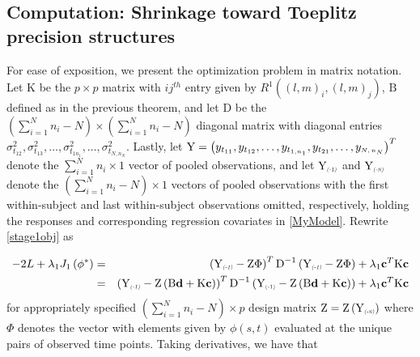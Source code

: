 \documentclass[12pt]{article}
\newcommand{\lmr}{\fontfamily{lmr}\selectfont} %
\newcommand{\bfd}{\mbox{\bf d}}
\newcommand{\bfc}{\mbox{\bf c}}
\newcommand{\bigY}{\mbox{Y}}
\newcommand{\matK}{\mbox{K}}
\newcommand{\matB}{\mbox{B}}
\newcommand{\matD}{\mbox{D}}
\newcommand{\matZ}{\mbox{Z}}
\begin{document}
\subsection{Computation: Shrinkage toward Toeplitz precision structures}
For ease of exposition, we present the optimization problem in matrix notation. Let $\matK$ be the $p \times p$ matrix with $ij^{th}$ entry given by $R^1\left( \left(l,m\right)_i, \left(l,m\right)_j \right)$, $\matB$ defined as in the previous theorem, and let $\matD$ be the $\left( \sum_{i=1}^N n_i - N\right) \times \left( \sum_{i=1}^N n_i - N\right)$ diagonal matrix with diagonal entries $\sigma_{t_{12}}^2, \sigma_{t_{13}}^2, \dots,\sigma_{t_{1n_1}}^2, \dots, \sigma_{t_{{N},{n_N}}}^2$. Lastly, let $\bigY = \left(y_{t_{11}}, y_{t_{12}}, \dots, y_{t_{1,n_1}},y_{t_{21}},\dots,y_{\textsc{\relsize{-4}\textsl{{$N,n_N$}}}}\right)^T$ denote the $\sum_{i=1}^N n_i \times 1$ vector of pooled observations, and let $\bigY_{\textsc{\relsize{-2}{\textsl{(-1)}}}}$ and $\bigY_{\textsc{\relsize{-2}{\textsl{(-n)}}}}$ denote the $\left( \sum_{i=1}^N n_i - N\right)\times 1$ vectors of pooled observations with the first within-subject and last within-subject observations omitted, respectively, holding the responses and corresponding regression covariates in \eqref{MyModel}.   Rewrite \eqref{stage1obj} as

\begin{eqnarray}
\nonumber
-2\lmr{L} + \lambda_1J_1\left(\phi^*\right) &=& \left(\bigY_{\textsc{\relsize{-2}{\textsl{(-1)}}}}  - \matZ \Phi \right)^T \matD^{-1} \left(\bigY_{\textsc{\relsize{-2}{\textsl{(-1)}}}} - \matZ \Phi \right) + \lambda_1 \bfc^T \matK \bfc \\
&=& \left(\bigY_{\textsc{\relsize{-2}{\textsl{(-1)}}}} - \matZ\left(\matB\bfd + \matK\bfc\right) \right)^T \matD^{-1} \left(\bigY_{\textsc{\relsize{-2}{(-1)}}}  - \matZ\left(\matB\bfd + \matK \bfc \right) \right) + \lambda_1 \bfc^T \matK \bfc 
\end{eqnarray}
\noindent 
for appropriately specified $\left(\sum \limits_{i=1}^N n_i - N \right) \times p$ design matrix $\matZ=\matZ\left(\bigY_{\textsc{\relsize{-2}{\textsl{(-n)}}}} \right)$ where $\Phi$ denotes the vector with elements given by $\phi\left(s,t\right)$ evaluated at the unique pairs of observed time points. Taking derivatives, we have that
 
\end{document}
